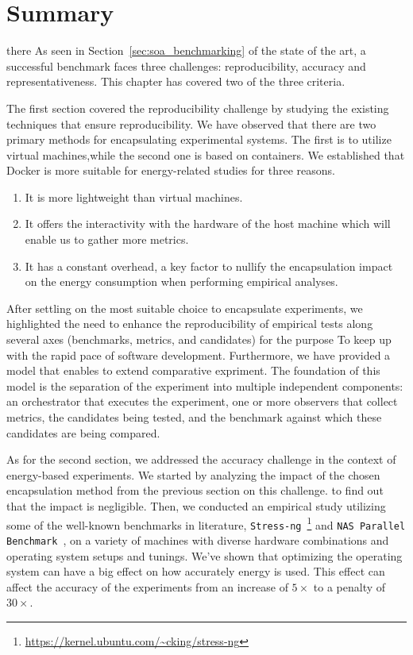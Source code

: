 
\clearpage
\section{Summary}
there As seen in Section~\cref{sec:soa_benchmarking} of the state of the art, a successful benchmark faces three challenges: reproducibility, accuracy and representativeness. 
This chapter has covered two of the three criteria.

The first section covered the reproducibility challenge by studying the existing techniques that ensure reproducibility. We have observed that there are two primary methods for encapsulating experimental systems. The first is to utilize virtual machines,while the second one is based on containers. We established that Docker is more suitable for energy-related studies for three reasons.

\begin{enumerate}
    \item It is more lightweight than virtual machines.
    \item It offers the interactivity with the hardware of the host machine which will enable us to gather more metrics.
    \item It has a constant overhead, a key factor to nullify the encapsulation impact on the energy consumption when performing empirical analyses.
\end{enumerate}

After settling on the most suitable choice to encapsulate experiments, we highlighted the need to enhance the reproducibility of empirical tests along several axes (benchmarks, metrics, and candidates) for the purpose To keep up with the rapid pace of software development. 
Furthermore, we have provided a model that enables to extend comparative expriment.
The foundation of this model is the separation of the experiment into multiple independent components: an orchestrator that executes the experiment, one or more observers that collect metrics, the candidates being tested, and the benchmark against which these candidates are being compared.

As for the second section, we addressed the accuracy challenge in the context of energy-based experiments.
We started by analyzing the impact of the chosen encapsulation method from the previous section on this challenge. to find out that the impact is negligible.
Then, we conducted an empirical study utilizing some of the well-known benchmarks in literature, \texttt{Stress-ng}~\footnote{\url{https://kernel.ubuntu.com/~cking/stress-ng}} and \texttt{NAS Parallel Benchmark}~\cite{Bailey:1991:NPB:125826.125925}, on a variety of machines with diverse hardware combinations and operating system setups and tunings. We've shown that optimizing the operating system can have a big effect on how accurately energy is used. This effect can affect the accuracy of the experiments  from an increase of $5\times$ to a penalty of $30\times$.

